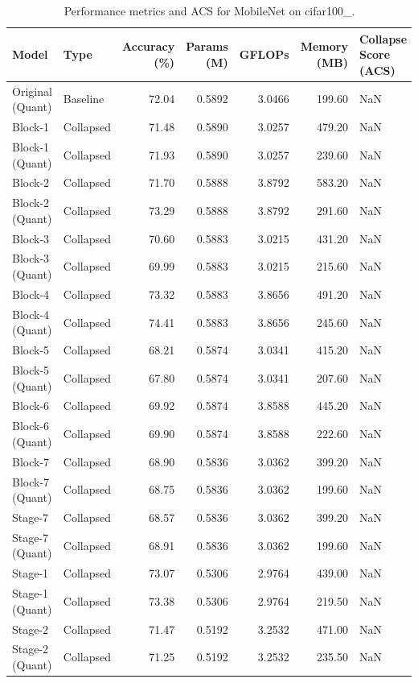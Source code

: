 \begin{table}
\caption{Performance metrics and ACS for MobileNet on cifar100_.}
\label{tab:MobileNet_cifar100_}
\begin{tabular}{llrrrrl}
\toprule
Model & Type & Accuracy (\%) & Params (M) & GFLOPs & Memory (MB) & Collapse Score (ACS) \\
\midrule
Original
(Quant) & Baseline & 72.04 & 0.5892 & 3.0466 & 199.60 & NaN \\
Block-1 & Collapsed & 71.48 & 0.5890 & 3.0257 & 479.20 & NaN \\
Block-1
(Quant) & Collapsed & 71.93 & 0.5890 & 3.0257 & 239.60 & NaN \\
Block-2 & Collapsed & 71.70 & 0.5888 & 3.8792 & 583.20 & NaN \\
Block-2
(Quant) & Collapsed & 73.29 & 0.5888 & 3.8792 & 291.60 & NaN \\
Block-3 & Collapsed & 70.60 & 0.5883 & 3.0215 & 431.20 & NaN \\
Block-3
(Quant) & Collapsed & 69.99 & 0.5883 & 3.0215 & 215.60 & NaN \\
Block-4 & Collapsed & 73.32 & 0.5883 & 3.8656 & 491.20 & NaN \\
Block-4
(Quant) & Collapsed & 74.41 & 0.5883 & 3.8656 & 245.60 & NaN \\
Block-5 & Collapsed & 68.21 & 0.5874 & 3.0341 & 415.20 & NaN \\
Block-5
(Quant) & Collapsed & 67.80 & 0.5874 & 3.0341 & 207.60 & NaN \\
Block-6 & Collapsed & 69.92 & 0.5874 & 3.8588 & 445.20 & NaN \\
Block-6
(Quant) & Collapsed & 69.90 & 0.5874 & 3.8588 & 222.60 & NaN \\
Block-7 & Collapsed & 68.90 & 0.5836 & 3.0362 & 399.20 & NaN \\
Block-7
(Quant) & Collapsed & 68.75 & 0.5836 & 3.0362 & 199.60 & NaN \\
Stage-7 & Collapsed & 68.57 & 0.5836 & 3.0362 & 399.20 & NaN \\
Stage-7
(Quant) & Collapsed & 68.91 & 0.5836 & 3.0362 & 199.60 & NaN \\
Stage-1 & Collapsed & 73.07 & 0.5306 & 2.9764 & 439.00 & NaN \\
Stage-1
(Quant) & Collapsed & 73.38 & 0.5306 & 2.9764 & 219.50 & NaN \\
Stage-2 & Collapsed & 71.47 & 0.5192 & 3.2532 & 471.00 & NaN \\
Stage-2
(Quant) & Collapsed & 71.25 & 0.5192 & 3.2532 & 235.50 & NaN \\

\end{tabular}
\end{table}

